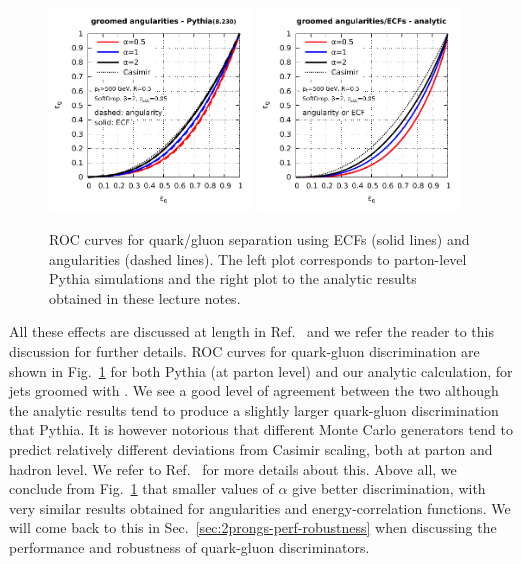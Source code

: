 \begin{figure}
  \includegraphics[width=0.48\textwidth,page=1]{figures/groomed-angularities-roc-pythia.pdf}%
  \hfill%
  \includegraphics[width=0.48\textwidth,page=1]{figures/groomed-angularities-roc-analytic.pdf}%
  \caption{ROC curves for quark/gluon separation using ECFs (solid lines) and angularities (dashed lines). The left plot
    corresponds to parton-level Pythia simulations and the right plot
    to the analytic results obtained in these lecture
    notes.}\label{fig:grm-ang-roc-v-alpha}
\end{figure}  


All these effects are discussed at length in
Ref.~\cite{Larkoski:2013eya} and we refer the reader to this
discussion for further details.
%
ROC curves for quark-gluon discrimination
are shown in Fig.~\ref{fig:grm-ang-roc-v-alpha} for both Pythia (at
parton level) and our analytic calculation, for jets groomed with \SD.
%
We see a good level of agreement between the two although the
analytic results tend to produce a slightly larger quark-gluon
discrimination that Pythia.
%
It is however notorious that different Monte Carlo generators tend to predict
relatively different deviations from Casimir scaling, both at parton and hadron level. We refer to Ref.~\cite{Gras:2017jty} for more
details about this. 
%
Above all, we conclude from Fig.~\ref{fig:grm-ang-roc-v-alpha} that smaller
values of $\alpha$ give better discrimination, with very similar
results obtained for angularities and energy-correlation functions.
%
We will come back to this in Sec.~\ref{sec:2prongs-perf-robustness}
when discussing the performance and robustness of quark-gluon
discriminators.


